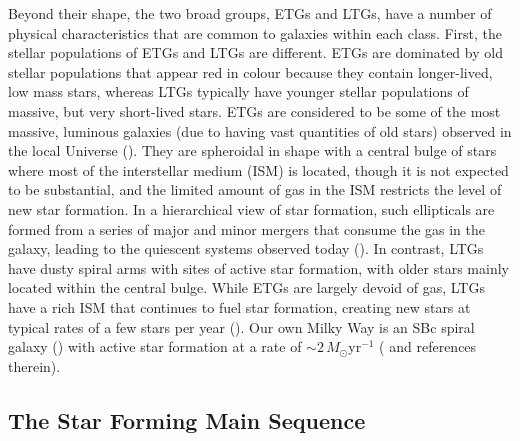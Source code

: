 Beyond their shape, the two broad groups, ETGs and LTGs, have a number of physical characteristics that are common to galaxies within each class. First, the stellar populations of ETGs and LTGs are different. ETGs are dominated by old stellar populations that appear red in colour because they contain longer-lived, low mass stars, whereas LTGs typically have younger stellar populations of massive, but very short-lived stars. ETGs are considered to be some of the most massive, luminous galaxies (due to having vast quantities of old stars) observed in the local Universe (\citealt{Bernardi_2003, Kelvin_2014, Moffett_2016}). They are spheroidal in shape with a central bulge of stars where most of the interstellar medium (ISM) is located, though it is not expected to be substantial, and the limited amount of gas in the ISM restricts the level of new star formation. In a hierarchical view of star formation, such ellipticals are formed from a series of major and minor mergers that consume the gas in the galaxy, leading to the quiescent systems observed today (\citealt{Toomre_1972}). In contrast, LTGs have dusty spiral arms with sites of active star formation, with older stars mainly located within the central bulge. While ETGs are largely devoid of gas, LTGs have a rich ISM that continues to fuel star formation, creating new stars at typical rates of a few stars per year (\citealt{Kennicutt_1983, Gao_2004}). Our own Milky Way is an SBc spiral galaxy (\citealt{Gerhard_2002}) with active star formation at a rate of $\sim 2\,M_\odot$yr$^{-1}$ (\citealt{Noriega-Crespo_2013, Licquia_2015, Elia_2022} and references therein).

\subsection{The Star Forming Main Sequence}
\label{sec:star_forming_main_sequence}

